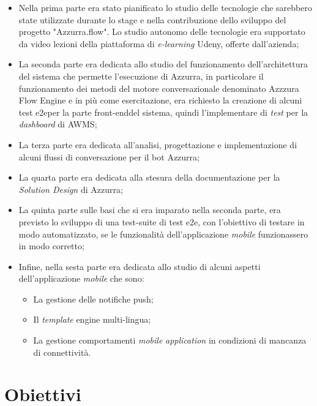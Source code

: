 \begin{itemize}
	\item Nella prima parte era stato pianificato lo studio delle tecnologie che sarebbero state utilizzate durante lo stage e nella contribuzione dello sviluppo del progetto "Azzurra.flow". Lo studio autonomo delle tecnologie era supportato da video lezioni della piattaforma di \emph{e-learning} Udeny, offerte dall'azienda;
	\item La seconda parte era dedicata allo studio del funzionamento dell'\gls{architettura}\ap{[g]} del sistema che permette l'esecuzione di Azzurra, in particolare il funzionamento dei metodi del motore conversazionale denominato Azzzura Flow Engine e in più come esercitazione, era richiesto la creazione di alcuni \gls{test e2e}\glsfirstoccur per la parte \gls{front-end}\glsfirstoccur del sistema, quindi l'implementare di \emph{test} per la \emph{dashboard} di \gls{AWMS};
	\item La terza parte era dedicata all'analisi, progettazione e implementazione di alcuni flussi di conversazione per il \gls{bot}\ap{[g]} Azzurra;
	\item La quarta parte era dedicata alla stesura della documentazione per la \emph{Solution Design} di Azzurra;
	\item La quinta parte sulle basi che si era imparato nella seconda parte, era previsto lo sviluppo di una test-suite di \gls{test e2e}\glsfirstoccur, con l'obiettivo di testare in modo automatizzato, se le funzionalità dell'applicazione \emph{mobile} funzionassero in modo corretto;
	\item Infine, nella sesta parte era dedicata allo studio di alcuni aspetti dell'applicazione \emph{mobile} che sono:
		\begin{itemize}
			\item La gestione delle notifiche push;
			\item Il \emph{template} engine multi-lingua;
			\item La gestione comportamenti \emph{mobile} \emph{application} in condizioni di mancanza di connettività.
		\end{itemize}
\end{itemize}



\section{Obiettivi}

